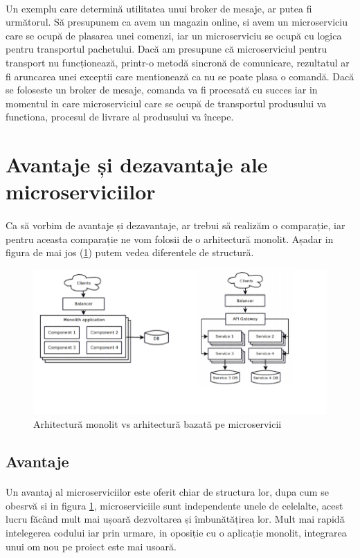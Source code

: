 \documentclass[12pt]{report}
\begin{document}
	\paragraph{}Un exemplu care determină utilitatea unui broker de mesaje, ar putea fi următorul. Să presupunem ca avem un magazin online, si avem un microserviciu care se ocupă de plasarea unei comenzi, iar un microserviciu se ocupă cu logica pentru transportul pachetului. Dacă am presupune că microserviciul pentru transport nu funcționează, printr-o metodă sincronă de comunicare, rezultatul ar fi aruncarea unei exceptii care mentionează ca nu se poate plasa o comandă. Dacă se foloseste un broker de mesaje, comanda va fi procesată cu succes iar in momentul in care microserviciul care se ocupă de transportul produsului va functiona, procesul de livrare al produsului va începe.
	\section{Avantaje și dezavantaje ale microserviciilor}
	\paragraph{}Ca să vorbim de avantaje și dezavantaje, ar trebui să realizăm o comparație, iar pentru aceasta comparație ne vom folosii de o arhitectură monolit. Așadar in figura de mai jos (\ref{movsmicr}) putem vedea diferentele de structură. 
	\begin{figure}[h]
  	\centering
  	\includegraphics[scale=1]{movsmicr}
	\caption{Arhitectură monolit vs arhitectură bazată pe microservicii \cite{savchenko2015microservices}}
	\label{movsmicr}
  	\end{figure}
  	\subsection{Avantaje}
  	\paragraph{}Un avantaj al microserviciilor este oferit chiar de structura lor, dupa cum se obesrvă si in figura \ref{movsmicr}, microserviciile sunt independente unele de celelalte, acest lucru făcând mult mai ușoară dezvoltarea și îmbunătățirea lor. Mult mai rapidă intelegerea codului iar prin urmare, in oposiție cu o aplicație monolit, integrarea unui om nou pe proiect este mai usoară.
\end{document}

